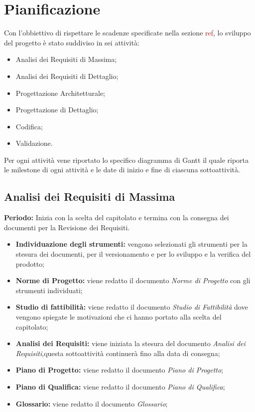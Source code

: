 \section{Pianificazione}
 
Con l'obbiettivo di rispettare le scadenze specificate nella sezione \textcolor{red}{ref}, lo sviluppo del progetto è stato suddiviso in sei attività:
 
\begin{itemize}
 
	\item Analisi dei Requisiti di Massima;
 
	\item Analisi dei Requisiti di Dettaglio;
 
	\item Progettazione Architetturale;
 
	\item Progettazione di Dettaglio;
 
	\item Codifica;
 
	\item Validazione.
 
\end{itemize}
 
Per ogni attività vene riportato lo specifico diagramma di Gantt il quale riporta le milestone di ogni attività e le date di inizio e fine di ciascuna sottoattività.
 

\subsection{Analisi dei Requisiti di Massima}
\textbf{Periodo:}
Inizia con la scelta del capitolato e termina con la consegna dei documenti per la Revisione dei Requisiti.
\begin{itemize}
	\item \textbf{Individuazione degli strumenti:} vengono selezionati gli strumenti per la stesura dei documenti, per il versionamento e per lo sviluppo e la verifica del prodotto;
	\item \textbf{Norme di Progetto:} viene redatto il documento \emph{Norme di Progetto} con gli strumenti individuati;  
	\item \textbf{Studio di fattibilità:} viene redatto il documento \emph{Studio di Fattibilità} dove vengono spiegate le motivazioni che ci hanno portato alla scelta del capitolato;
	\item \textbf{Analisi dei Requisiti:} viene iniziata la stesura del documento \emph{Analisi dei Requisiti},questa sottoattività continuerà fino alla data di consegna;
	\item \textbf{Piano di Progetto:} viene redatto il documento \emph{Piano di Progetto}; 
	\item \textbf{Piano di Qualifica:} viene redatto il documento \emph{Piano di Qualifica};
	\item \textbf{Glossario:} viene redatto il documento \emph{Glossario};
\end{itemize}
